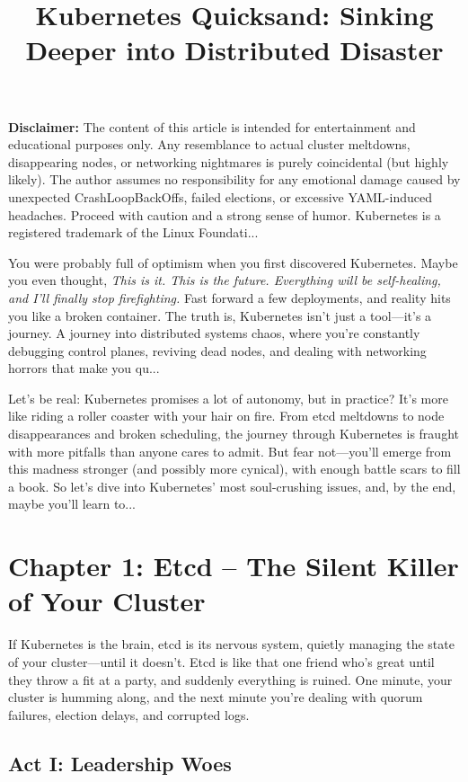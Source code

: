 \documentclass{article}
\title{Kubernetes Quicksand: Sinking Deeper into Distributed Disaster}
\author{}
\begin{document}
\maketitle

\textbf{Disclaimer:} The content of this article is intended for entertainment and educational purposes only. Any resemblance to actual cluster meltdowns, disappearing nodes, or networking nightmares is purely coincidental (but highly likely). The author assumes no responsibility for any emotional damage caused by unexpected CrashLoopBackOffs, failed elections, or excessive YAML-induced headaches. Proceed with caution and a strong sense of humor. Kubernetes is a registered trademark of the Linux Foundati...

You were probably full of optimism when you first discovered Kubernetes. Maybe you even thought, \textit{This is it. This is the future. Everything will be self-healing, and I’ll finally stop firefighting.} Fast forward a few deployments, and reality hits you like a broken container. The truth is, Kubernetes isn’t just a tool—it’s a journey. A journey into distributed systems chaos, where you’re constantly debugging control planes, reviving dead nodes, and dealing with networking horrors that make you qu...

Let’s be real: Kubernetes promises a lot of autonomy, but in practice? It’s more like riding a roller coaster with your hair on fire. From etcd meltdowns to node disappearances and broken scheduling, the journey through Kubernetes is fraught with more pitfalls than anyone cares to admit. But fear not—you’ll emerge from this madness stronger (and possibly more cynical), with enough battle scars to fill a book. So let’s dive into Kubernetes' most soul-crushing issues, and, by the end, maybe you’ll learn to...

\section{Chapter 1: Etcd – The Silent Killer of Your Cluster}

If Kubernetes is the brain, etcd is its nervous system, quietly managing the state of your cluster—until it doesn’t. Etcd is like that one friend who’s great until they throw a fit at a party, and suddenly everything is ruined. One minute, your cluster is humming along, and the next minute you’re dealing with quorum failures, election delays, and corrupted logs.

\subsection{Act I: Leadership Woes}
\end{document}
